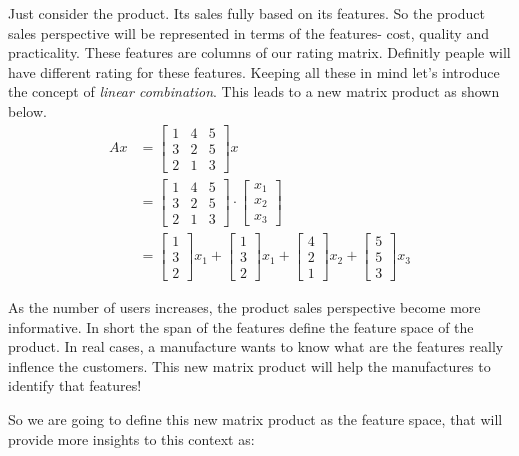 \documentclass[
  letterpaper,
  DIV=11,
  numbers=noendperiod]{scrreprt}
\theoremstyle{plain}
\theoremstyle{definition}
\theoremstyle{remark}
\begin{document}
Just consider the product. Its sales fully based on its features. So the
product sales perspective will be represented in terms of the features-
cost, quality and practicality. These features are columns of our rating
matrix. Definitly peaple will have different rating for these features.
Keeping all these in mind let's introduce the concept of \emph{linear
combination}. This leads to a new matrix product as shown below.
\begin{align*}
Ax&=\begin{bmatrix}1&4&5\\3&2&5\\2&1&3\end{bmatrix}x\\
&=\begin{bmatrix}1&4&5\\3&2&5\\2&1&3\end{bmatrix}\cdot\begin{bmatrix}x_1\\x_2\\x_3\end{bmatrix}\\
&=\begin{bmatrix}1\\3\\2\end{bmatrix}x_1+\begin{bmatrix}1\\3\\2\end{bmatrix}x_1+\begin{bmatrix}4\\2\\1\end{bmatrix}x_2+\begin{bmatrix}5\\5\\3\end{bmatrix}x_3
\end{align*}

As the number of users increases, the product sales perspective become
more informative. In short the span of the features define the feature
space of the product. In real cases, a manufacture wants to know what
are the features really inflence the customers. This new matrix product
will help the manufactures to identify that features!

So we are going to define this new matrix product as the feature space,
that will provide more insights to this context as:
\end{document}
